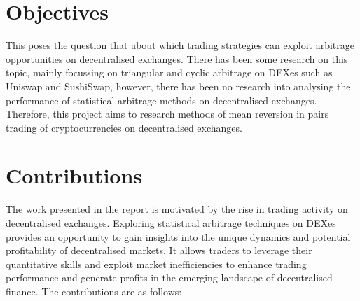 \section{Objectives}
This poses the question that about which trading strategies can exploit arbitrage opportunities on decentralised exchanges. There has been some research on this topic, mainly focussing on triangular and cyclic arbitrage on DEXes such as Uniswap and SushiSwap, however, there has been no research into analysing the performance of statistical arbitrage methods on decentralised exchanges. Therefore, this project aims to research methods of mean reversion in pairs trading of cryptocurrencies on decentralised exchanges.

\section{Contributions}
The work presented in the report is motivated by the rise in trading activity on decentralised exchanges. Exploring statistical arbitrage techniques on DEXes provides an opportunity to gain insights into the unique dynamics and potential profitability of decentralised markets. It allows traders to leverage their quantitative skills and exploit market inefficiencies to enhance trading performance and generate profits in the emerging landscape of decentralised finance. The contributions are as follows:
